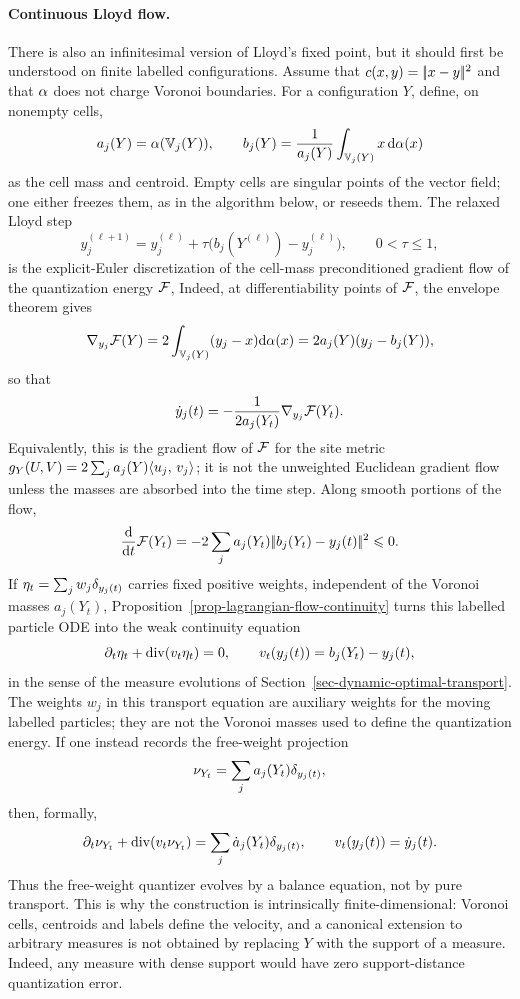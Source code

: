 \paragraph{Continuous Lloyd flow.}
There is also an infinitesimal version of Lloyd's fixed point, but it should first be understood on finite labelled configurations. Assume that \(c(x,y)=|\!| x-y |\!|^2\) and that \(\alpha\) does not charge Voronoi boundaries. For a configuration \(Y\), define, on nonempty cells,
\[
	a_j(Y)=\alpha(\mathbb{V}_j(Y)),
	\qquad
	b_j(Y)=\frac{1}{a_j(Y)}\int_{\mathbb{V}_j(Y)}x\,\mathrm{d}\alpha(x)
\]
as the cell mass and centroid. Empty cells are singular points of the vector field; one either freezes them, as in the algorithm below, or reseeds them. The relaxed Lloyd step
\[
	y_j^{(\ell+1)}=y_j^{(\ell)}+\tau\big(b_j(Y^{(\ell)})-y_j^{(\ell)}\big),
	\qquad 0<\tau\leq 1,
\]
is the explicit-Euler discretization of the cell-mass preconditioned gradient flow of the quantization energy \(\mathcal{F}\),
Indeed, at differentiability points of \(\mathcal{F}\), the envelope theorem gives
\[
	\nabla_{y_j}\mathcal{F}(Y)
	=
	2\int_{\mathbb{V}_j(Y)}(y_j-x)\mathrm{d}\alpha(x)
	=
	2a_j(Y)(y_j-b_j(Y)),
\]
so that
\[
	\dot y_j(t)
	=
	-\frac{1}{2a_j(Y_t)}\nabla_{y_j}\mathcal{F}(Y_t).
\]
Equivalently, this is the gradient flow of \(\mathcal{F}\) for the site metric \(g_Y(U,V)=2\sum_j a_j(Y)\langle u_j,\,v_j\rangle\); it is not the unweighted Euclidean gradient flow unless the masses are absorbed into the time step. Along smooth portions of the flow,
\[
	\frac{\mathrm{d}}{\mathrm{d} t}\mathcal{F}(Y_t)
	=
	-2\sum_j a_j(Y_t)|\!| b_j(Y_t)-y_j(t) |\!|^2
	\leqslant 0.
\]
If \(\eta_t=\sum_j w_j\delta_{y_j(t)}\) carries fixed positive weights, independent of the Voronoi masses \(a_j(Y_t)\), Proposition~\ref{prop-lagrangian-flow-continuity} turns this labelled particle ODE into the weak continuity equation
\[
	\partial_t\eta_t+\operatorname{div}(v_t\eta_t)=0,
	\qquad
	v_t(y_j(t))=b_j(Y_t)-y_j(t),
\]
in the sense of the measure evolutions of Section~\ref{sec-dynamic-optimal-transport}. The weights \(w_j\) in this transport equation are auxiliary weights for the moving labelled particles; they are not the Voronoi masses used to define the quantization energy. If one instead records the free-weight projection
\[
	\nu_{Y_t}=\sum_j a_j(Y_t)\delta_{y_j(t)},
\]
then, formally,
\[
	\partial_t\nu_{Y_t}+\operatorname{div}(v_t\nu_{Y_t})
	=
	\sum_j \dot a_j(Y_t)\delta_{y_j(t)},
	\qquad
	v_t(y_j(t))=\dot y_j(t).
\]
Thus the free-weight quantizer evolves by a balance equation, not by pure transport. This is why the construction is intrinsically finite-dimensional: Voronoi cells, centroids and labels define the velocity, and a canonical extension to arbitrary measures is not obtained by replacing \(Y\) with the support of a measure. Indeed, any measure with dense support would have zero support-distance quantization error.

